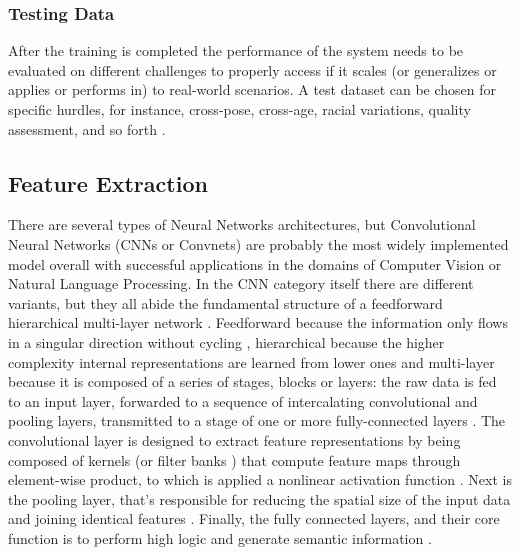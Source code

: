 \documentclass[class=report, crop=false, a4paper, 12pt]{standalone}
\begin{document}
\newpage
\subsubsection{\large Testing Data}

\par After the training is completed the performance of the system needs to be evaluated on different challenges to properly access if it scales (or generalizes or applies or performs in) to real-world scenarios. A test dataset can be chosen for specific hurdles, for instance, cross-pose, cross-age, racial variations, quality assessment, and so forth \autocite{duElementsEndtoendDeep2022}.


\subsection{Feature Extraction}

There are several types of Neural Networks architectures, but Convolutional Neural Networks (CNNs or Convnets) are probably the most widely implemented model overall \autocite{yamashitaConvolutionalNeuralNetworks2018, liSurveyConvolutionalNeural2022} with successful applications in the domains of Computer Vision \autocite{krizhevskyImageNetClassificationDeep2012,taigmanDeepFaceClosingGap2014,tompsonEfficientObjectLocalization2015, zhangImprovedBreastCancer2021} or Natural Language Processing\autocite{abdel-hamidConvolutionalNeuralNetworks2014, wangGenCNNConvolutionalArchitecture2015, xiangConvolutionalNeuralNetworkbased2020}. In the CNN category itself there are different variants, but they all abide the fundamental structure of a feedforward hierarchical multi-layer network . Feedforward because the information only flows in a singular direction without cycling \autocite{zellSimulationNeuronalerNetze1994}, hierarchical because the higher complexity internal representations are learned from lower ones \autocite{lecunDeepLearning2015, zhuBCNNBranchConvolutional2017} and multi-layer because it is composed of a series of stages, blocks or layers: the raw data is fed to an input layer, forwarded to a sequence of intercalating convolutional and pooling layers, transmitted to a stage of one or more fully-connected layers \autocite{lecunDeepLearning2015, yamashitaConvolutionalNeuralNetworks2018, guRecentAdvancesConvolutional2018, alzubaidiReviewDeepLearning2021}. The convolutional layer is designed to extract feature representations by being composed of kernels (or filter banks \autocite{lecunDeepLearning2015}) that compute feature maps through element-wise product, to which is applied a nonlinear activation function \autocite{guRecentAdvancesConvolutional2018,yamashitaConvolutionalNeuralNetworks2018}. Next is the pooling layer, that's responsible for reducing the spatial size of the input data \autocite{guRecentAdvancesConvolutional2018} and joining identical features \autocite{lecunDeepLearning2015}. Finally, the fully connected layers, and their core function is to perform high logic and generate semantic information \autocite{guRecentAdvancesConvolutional2018}.
\end{document}
